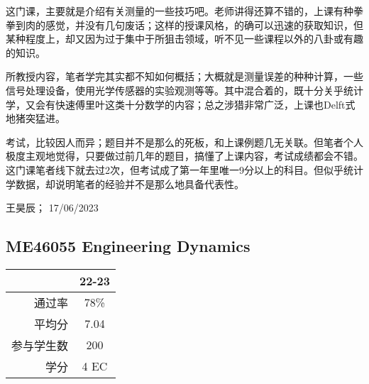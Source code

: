 这门课，主要就是介绍有关测量的一些技巧吧。老师讲得还算不错的，上课有种拳拳到肉的感觉，并没有几句废话；这样的授课风格，的确可以迅速的获取知识，但某种程度上，却又因为过于集中于所狙击领域，听不见一些课程以外的八卦或有趣的知识。

所教授内容，笔者学完其实都不知如何概括；大概就是测量误差的种种计算，一些信号处理设备，使用光学传感器的实验观测等等。其中混合着的，既十分关乎统计学，又会有快速傅里叶这类十分数学的内容；总之涉猎非常广泛，上课也Delft式地猪突猛进。

考试，比较因人而异；题目并不是那么的死板，和上课例题几无关联。但笔者个人极度主观地觉得，只要做过前几年的题目，搞懂了上课内容，考试成绩都会不错。这门课笔者线下就去过2次，但考试成了第一年里唯一9分以上的科目。但似乎统计学数据，却说明笔者的经验并不是那么地具备代表性。

\begin{flushright}
王昊辰； 17/06/2023
\end{flushright}

\subsection{ME46055 Engineering Dynamics}
\begin{minipage}{0.45\textwidth}
\centering
{}
\end{minipage}%
\begin{minipage}{0.45\textwidth}
\raggedleft
\begin{tabular}{r|c}
\textbf{ } & \textbf{22-23} \\ \hline
通过率 & 78\% \\ 
平均分 & 7.04\\ 
参与学生数 & 200 \\ 
学分 & 4 EC\\
\end{tabular}
\end{minipage}\\


